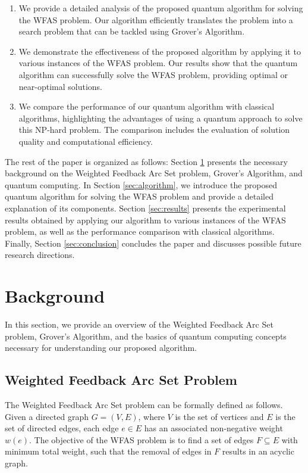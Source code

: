 \begin{enumerate}
    \item We provide a detailed analysis of the proposed quantum algorithm for solving the WFAS problem. Our algorithm efficiently translates the problem into a search problem that can be tackled using Grover's Algorithm.
    
    \item We demonstrate the effectiveness of the proposed algorithm by applying it to various instances of the WFAS problem. Our results show that the quantum algorithm can successfully solve the WFAS problem, providing optimal or near-optimal solutions.
    
    \item We compare the performance of our quantum algorithm with classical algorithms, highlighting the advantages of using a quantum approach to solve this NP-hard problem. The comparison includes the evaluation of solution quality and computational efficiency.
\end{enumerate}

The rest of the paper is organized as follows: Section \ref{sec:background} presents the necessary background on the Weighted Feedback Arc Set problem, Grover's Algorithm, and quantum computing. In Section \ref{sec:algorithm}, we introduce the proposed quantum algorithm for solving the WFAS problem and provide a detailed explanation of its components. Section \ref{sec:results} presents the experimental results obtained by applying our algorithm to various instances of the WFAS problem, as well as the performance comparison with classical algorithms. Finally, Section \ref{sec:conclusion} concludes the paper and discusses possible future research directions.

\section{Background} \label{sec:background}

In this section, we provide an overview of the Weighted Feedback Arc Set problem, Grover's Algorithm, and the basics of quantum computing concepts necessary for understanding our proposed algorithm.

\subsection{Weighted Feedback Arc Set Problem}

The Weighted Feedback Arc Set problem can be formally defined as follows. Given a directed graph $G=(V, E)$, where $V$ is the set of vertices and $E$ is the set of directed edges, each edge $e \in E$ has an associated non-negative weight $w(e)$. The objective of the WFAS problem is to find a set of edges $F \subseteq E$ with minimum total weight, such that the removal of edges in $F$ results in an acyclic graph.

